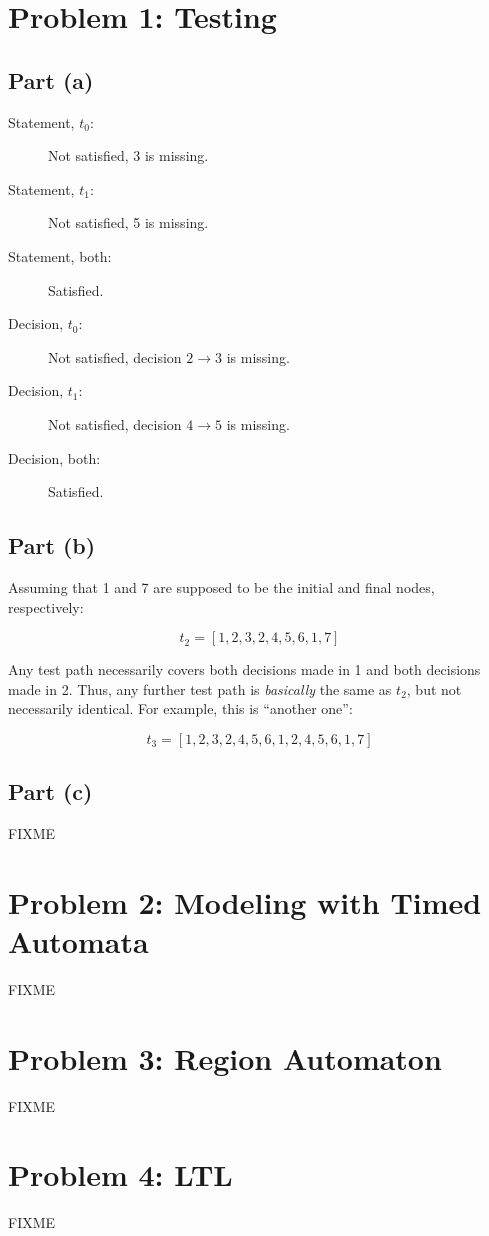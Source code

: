 \documentclass[a4paper,parskip,headheight=38pt]{scrartcl} %
\begin{document}
\section*{Problem 1: Testing}

\subsection*{Part (a)}

\begin{description}
    \item[Statement, $t_0$:] Not satisfied, 3 is missing.
    \item[Statement, $t_1$:] Not satisfied, 5 is missing.
    \item[Statement, both:] Satisfied.
    \item[Decision, $t_0$:] Not satisfied, decision $2 \rightarrow 3$ is missing.
    \item[Decision, $t_1$:] Not satisfied, decision $4 \rightarrow 5$ is missing.
    \item[Decision, both:] Satisfied.
\end{description}

\subsection*{Part (b)}

Assuming that 1 and 7 are supposed to be the initial and final nodes, respectively:

\[ t_2 = [1, 2, 3, 2, 4, 5, 6, 1, 7] \]

Any test path necessarily covers both decisions made in 1 and both
decisions made in 2.  Thus, any further test path is \emph{basically}
the same as $t_2$, but not necessarily identical.  For example, this is
\enquote{another one}:

\[ t_3 = [1, 2, 3, 2, 4, 5, 6, 1, 2, 4, 5, 6, 1, 7] \]

\subsection*{Part (c)}

FIXME


\section*{Problem 2: Modeling with Timed Automata}

FIXME


\section*{Problem 3: Region Automaton}

FIXME


\section*{Problem 4: LTL}

FIXME
\end{document}
